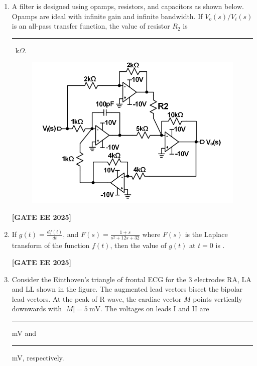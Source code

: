 \documentclass[journal]{IEEEtran}
\newcommand{\qfooter}{%
  \begin{flushright}\footnotesize\textbf{[GATE EE 2025]}\end{flushright}\vspace{1em}%
}
\begin{document}
\begin{enumerate}
\item A filter is designed using opamps, resistors, and capacitors as shown below. Opamps are ideal with infinite gain and infinite bandwidth. If $V_o(s)/V_i(s)$ is an all-pass transfer function, the value of resistor $R_2$ is \rule{2cm}{0.15mm}\ k$\Omega$.

\begin{figure}[h]
\centering
\includegraphics[width=0.48\columnwidth]{figs/q41.png}
\end{figure}

\begin{enumerate}
\qfooter
\end{enumerate}

\item If \( g(t) = \frac{df(t)}{dt} \), and \( F(s) = \frac{1 + s}{s^2 + 12s + 32} \) where \( F(s) \) is the Laplace transform of the function \( f(t) \), then the value of \( g(t) \) at \( t=0 \) is \underline{\hspace{2cm}}.

\begin{enumerate}
\end{enumerate}
\qfooter

\item Consider the Einthoven’s triangle of frontal ECG for the 3 electrodes RA, LA and LL shown in the figure. The augmented lead vectors bisect the bipolar lead vectors. At the peak of R wave, the cardiac vector $M$ points vertically downwards with $|M| = 5\ \text{mV}$.  
The voltages on leads I and II are \rule{1.5cm}{0.15mm} mV and \rule{1.5cm}{0.15mm} mV, respectively.


\end{enumerate}
\end{document}
